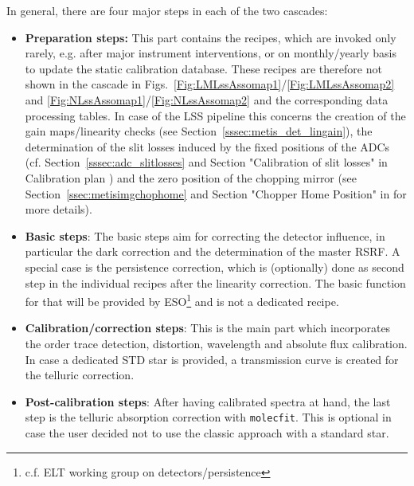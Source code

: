 In general, there are four major steps in each of the two cascades:
\begin{itemize}
    \item \textbf{Preparation steps:} This part contains the recipes, which are invoked only rarely, e.g. after major instrument interventions, or on monthly/yearly basis to update the static calibration database. These recipes are therefore not shown in the cascade in Figs.~\ref{Fig:LMLssAssomap1}/\ref{Fig:LMLssAssomap2} and \ref{Fig:NLssAssomap1}/\ref{Fig:NLssAssomap2} and the corresponding data processing tables. In case of the \ac{LSS} pipeline this concerns the creation of the gain maps/linearity checks (see Section~\ref{sssec:metis_det_lingain}), the determination of the slit losses induced by the fixed positions of the ADCs (cf. Section~\ref{sssec:adc_slitlosses} and Section "Calibration of slit losses" in Calibration plan \cite{METIS-calibration_plan}) and the zero position of the chopping mirror (see Section~\ref{ssec:metisimgchophome} and Section "Chopper Home Position" in \cite{METIS-calibration_plan} for more details). 
    \item \textbf{Basic steps}: The basic steps aim for correcting the detector influence, in particular the dark correction and the determination of the master \ac{RSRF}. A special case is the persistence correction, which is (optionally) done as second step in the individual recipes after the linearity correction. The basic function for that will be provided by \ac{ESO}\footnote{c.f. \ac{ELT} working group on detectors/persistence} and is not a dedicated recipe. 
    \item \textbf{Calibration/correction steps}: This is the main part which incorporates the order trace detection, distortion, wavelength and absolute flux calibration. In case a dedicated \ac{STD} star is provided, a transmission curve is created for the telluric correction.
    \item \textbf{Post-calibration steps}: After having calibrated spectra at hand, the last step is the telluric absorption correction with \texttt{molecfit}. This is optional in case the user decided not to use the classic approach with a standard star.
\end{itemize}

